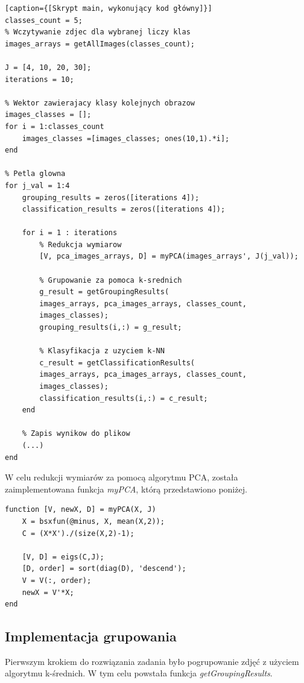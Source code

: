 \begin{lstlisting}[linewidth=16.0cm][caption={[Skrypt main, wykonujący kod główny]}]
classes_count = 5;
% Wczytywanie zdjec dla wybranej liczy klas
images_arrays = getAllImages(classes_count);
	
J = [4, 10, 20, 30];
iterations = 10;
	
% Wektor zawierajacy klasy kolejnych obrazow
images_classes = [];
for i = 1:classes_count
	images_classes =[images_classes; ones(10,1).*i];
end
	
% Petla glowna
for j_val = 1:4
	grouping_results = zeros([iterations 4]);
	classification_results = zeros([iterations 4]);
	
	for i = 1 : iterations
		% Redukcja wymiarow
		[V, pca_images_arrays, D] = myPCA(images_arrays', J(j_val));
		
		% Grupowanie za pomoca k-srednich
		g_result = getGroupingResults(
		images_arrays, pca_images_arrays, classes_count, 
		images_classes);
		grouping_results(i,:) = g_result;
		
		% Klasyfikacja z uzyciem k-NN
		c_result = getClassificationResults(
		images_arrays, pca_images_arrays, classes_count, 
		images_classes);
		classification_results(i,:) = c_result;
	end
	
	% Zapis wynikow do plikow
	(...)
end
\end{lstlisting}

\vspace{5mm}

W celu redukcji wymiarów za pomocą algorytmu PCA, została zaimplementowana funkcja \textit{myPCA}, którą przedstawiono poniżej.

\vspace{5mm}

\begin{lstlisting}[linewidth=16.0cm]
function [V, newX, D] = myPCA(X, J)
	X = bsxfun(@minus, X, mean(X,2));
	C = (X*X')./(size(X,2)-1);
	
	[V, D] = eigs(C,J);
	[D, order] = sort(diag(D), 'descend');
	V = V(:, order);
	newX = V'*X;
end
\end{lstlisting}


\subsection{Implementacja grupowania}

Pierwszym krokiem do rozwiązania zadania było pogrupowanie zdjęć z użyciem algorytmu k-średnich. W tym celu powstała funkcja \textit{getGroupingResults}. 

